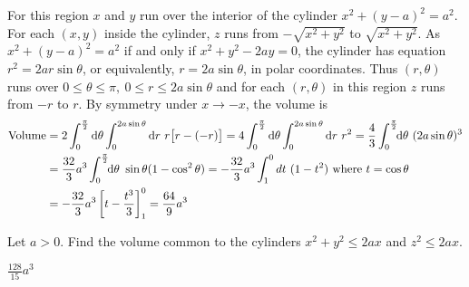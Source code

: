 \begin{solution}
For this region $x$ and $y$ run over the interior of the 
cylinder $x^2+(y-a)^2=a^2$. For each $(x,y)$ inside the 
cylinder, $z$ runs from $-\sqrt{x^2+y^2}$ to $\sqrt{x^2+y^2}$.
As $x^2+(y-a)^2=a^2$ if and only if $x^2+y^2-2ay=0$, the cylinder
has equation $r^2=2ar\sin\theta$, or equivalently, $r=2a\sin\theta$,
in polar coordinates. 
%
Thus $(r,\theta)$ runs over $0\le\theta\le\pi,\ 
0\le r\le 2a\sin\theta$ and for each $(r,\theta)$ in this region $z$ runs from
$-r$ to $r$. By symmetry under $x\rightarrow -x$,
the volume is
\begin{align*}
\text{Volume}
&=2\int_0^{{\pi\over 2}}\dee{\theta}\int_0^{2a\sin\theta}\dee{r}\  
                                             r\big[r-(-r)\big]
=4\int_0^{{\pi\over 2}}\dee{\theta}\int_0^{2a\sin\theta}\dee{r}\ r^2
=\frac{4}{3}\int_0^{{\pi\over 2}}\!\!\dee{\theta}\ (2a\sin\theta)^3 \\
&=\frac{32}{3}a^3\int_0^{{\pi\over 2}}\!\!\dee{\theta}\ \sin\theta(1-\cos^2\theta)
=-\frac{32}{3}a^3\int_1^0 dt\ (1-t^2)\text{ where $t=\cos\theta$ }\cr
&=-\frac{32}{3}a^3\left[t-\frac{t^3}{3}\right]_1^0
=\frac{64}{9}a^3
\end{align*}
\end{solution}

\begin{question}
Let $a>0$.
Find the volume common to the cylinders $x^2+y^2\le 2ax$ and 
$z^2\le 2ax$.
\end{question}

%

\begin{answer}
$\frac{128}{15}a^3$
\end{answer}

